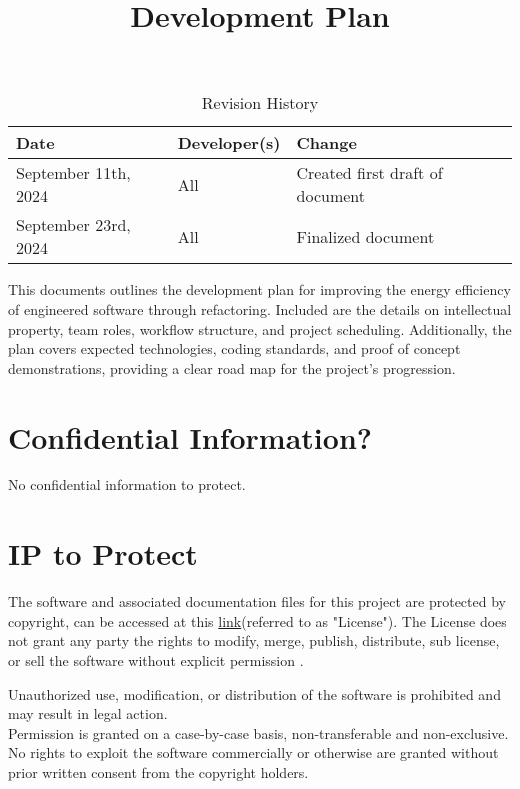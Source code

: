 \documentclass{article}
\title{Development Plan\\ \progname}
\author{\authname}
\date{}
\begin{document}
\maketitle

\begin{table}[hp]
  \caption{Revision History} \label{TblRevisionHistory}
  \begin{tabularx}{\textwidth}{llX}
    \toprule
    \textbf{Date} & \textbf{Developer(s)} & \textbf{Change}\\
    \midrule
    September 11th, 2024 & All & Created first draft of document\\
    September 23rd, 2024 & All & Finalized document\\
    \bottomrule
  \end{tabularx}
\end{table}

\newpage{}

\noindent
This documents outlines the development plan for improving the energy efficiency of
engineered software through refactoring. Included are the details on intellectual property,
team roles, workflow structure, and project scheduling. Additionally, the plan covers
expected technologies, coding standards, and proof of concept demonstrations, providing
a clear road map for the project's progression.

\section{Confidential Information?}

No confidential information to protect.
\section{IP to Protect}

\hspace{\parindent}The software and associated documentation files for this project are protected by copyright, can be accessed at this \href{https://github.com/ssm-lab/capstone--source-code-optimizer/blob/main/LICENSE}{ link}(referred to as "License"). The License does not grant any party the rights to modify, merge, publish, distribute, sub license, or sell the software without explicit permission .

Unauthorized use, modification, or distribution of the software is prohibited and may result in legal action.
\\

\hspace{\parindent} Permission is granted on a case-by-case basis, non-transferable and non-exclusive. No rights to exploit the software commercially or otherwise are granted without prior written consent from the copyright holders.
\end{document}
